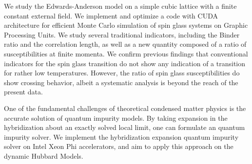 \documentclass[edeposit,fullpage]{uiucthesis07}
\begin{document}
We study the Edwards-Anderson model on a simple cubic lattice with a finite 
constant external field. We implement and optimize a code with CUDA 
architecture for efficient Monte Carlo simulation of spin glass systems on 
Graphic Processing Units. 
We study several traditional indicators, including the Binder ratio and the 
correlation length, as well as a new quantity composed of 
a ratio of susceptibilities at finite momenta.%
We confirm previous findings that conventional indicators for the 
spin glass transition do not show any indication of a transition for rather 
low temperatures. 
However, the ratio of spin glass susceptibilities do show crossing behavior, 
albeit a systematic analysis is beyond the reach of the present data. 


One of the fundamental challenges of theoretical condensed matter physics is 
the accurate solution of quantum impurity models. By taking expansion in the 
hybridization about an exactly solved local limit, one can formulate an quantum
impurity solver. We implement the hybridization expansion quantum impurity
solver on Intel Xeon Phi accelerators, and aim to apply this approach on the
dynamic Hubbard Models.





\mainmatter






%

\backmatter

\end{document}
